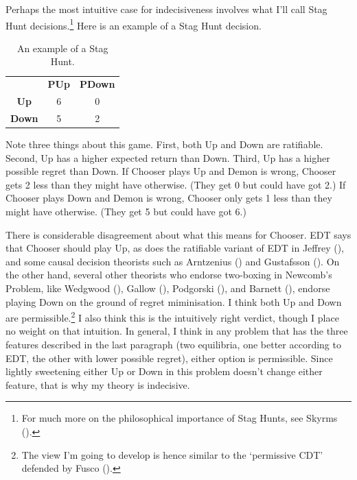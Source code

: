 \documentclass[
  12pt,
  letterpaper,
  DIV=11,
  numbers=noendperiod]{scrreprt}
\begin{document}
Perhaps the most intuitive case for indecisiveness involves what I'll
call Stag Hunt decisions.\footnote{For much more on the philosophical
  importance of Stag Hunts, see Skyrms
  ().} Here is an example of a Stag Hunt
decision.

\begin{longtable}[]{@{}ccc@{}}
\caption{An example of a Stag Hunt.}\label{tbl-stag-hunt}\tabularnewline
\toprule\noalign{}
\endfirsthead
\endhead
\bottomrule\noalign{}
\endlastfoot
& \textbf{PUp} & \textbf{PDown} \\
\textbf{Up} & 6 & 0 \\
\textbf{Down} & 5 & 2 \\
\end{longtable}

Note three things about this game. First, both Up and Down are
ratifiable. Second, Up has a higher expected return than Down. Third, Up
has a higher possible regret than Down. If Chooser plays Up and Demon is
wrong, Chooser gets 2 less than they might have otherwise. (They get 0
but could have got 2.) If Chooser plays Down and Demon is wrong, Chooser
only gets 1 less than they might have otherwise. (They get 5 but could
have got 6.)

There is considerable disagreement about what this means for Chooser.
EDT says that Chooser should play Up, as does the ratifiable variant of
EDT in Jeffrey (), and some causal
decision theorists such as Arntzenius
() and Gustafsson
(). On the other hand, several other
theorists who endorse two-boxing in Newcomb's Problem, like Wedgwood
(), Gallow
(), Podgorski
(), and Barnett
(), endorse playing Down on the ground
of regret miminisation. I think both Up and Down are
permissible.\footnote{The view I'm going to develop is hence similar to
  the `permissive CDT' defended by Fusco ().}
I also think this is the intuitively right verdict, though I place no
weight on that intuition. In general, I think in any problem that has
the three features described in the last paragraph (two equilibria, one
better according to EDT, the other with lower possible regret), either
option is permissible. Since lightly sweetening either Up or Down in
this problem doesn't change either feature, that is why my theory is
indecisive.
\end{document}
